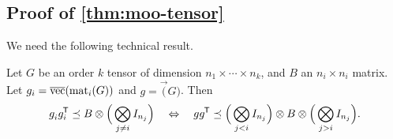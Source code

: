 \subsection{Proof of \cref{thm:moo-tensor}}

We need the following technical result.

\begin{lemma}\label{lem:transpose-tensor}
Let $G$ be an order $k$ tensor of dimension $n_1 \times \cdots \times n_k$, and $B$ an
$n_i\times n_i$ matrix.  Let $g_i = \overline{\mathrm{vec}}(\mathrm{mat}_{i}(G))$ and $g = \vec(G)$. Then
\begin{align*}
g_i^{} g_i^{\mkern-1.5mu\scriptstyle\mathsf{T}}
\preceq
B \otimes \mathopen{}\Big( \bigotimes_{j\neq i} I_{n_j} \Big)
~~~\Leftrightarrow~~~
gg^{\mkern-1.5mu\scriptstyle\mathsf{T}}
\preceq
\mathopen{}\Big( \bigotimes_{j<i} I_{n_j} \Big) \otimes B \otimes \mathopen{}\Big( \bigotimes_{j>i} I_{n_j} \Big)
.
\end{align*}
\end{lemma}
